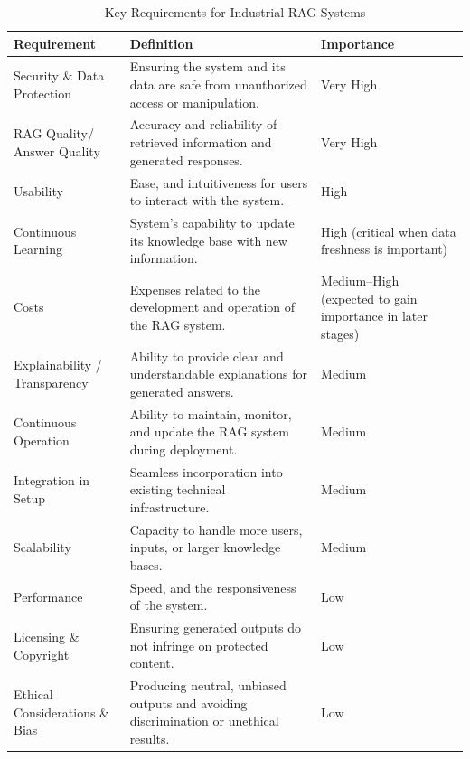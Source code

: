 \begin{table}[h!]
\centering
\caption{Key Requirements for Industrial RAG Systems \cite{Brehme}}
\label{tab:RAG_requirements}
\begin{tabular}{|p{3.5cm}|p{6.5cm}|p{3cm}|}
\hline
\textbf{Requirement} & \textbf{Definition} & \textbf{Importance} \\ \hline
Security \& Data Protection & Ensuring the system and its data are safe from unauthorized access or manipulation. & Very High \\ \hline
RAG Quality/ Answer Quality & Accuracy and reliability of retrieved information and generated responses. & Very High \\ \hline
Usability & Ease, and intuitiveness for users to interact with the system. & High \\ \hline

Continuous Learning & System’s capability to update its knowledge base with new information. & High (critical when data freshness is important) \\ \hline
Costs & Expenses related to the development and operation of the RAG system. & Medium–High (expected to gain importance in later stages) \\ \hline
Explainability / Transparency & Ability to provide clear and understandable explanations for generated answers. & Medium \\ \hline
Continuous Operation & Ability to maintain, monitor, and update the RAG system during deployment. & Medium \\ \hline
Integration in Setup & Seamless incorporation into existing technical infrastructure. & Medium \\ \hline
Scalability & Capacity to handle more users, inputs, or larger knowledge bases. & Medium \\ \hline
Performance & Speed, and the responsiveness of the system. & Low \\ \hline
Licensing \& Copyright & Ensuring generated outputs do not infringe on protected content. & Low \\ \hline
Ethical Considerations \& Bias & Producing neutral, unbiased outputs and avoiding discrimination or unethical results. & Low \\ \hline
\end{tabular}
\end{table}

\newpage
